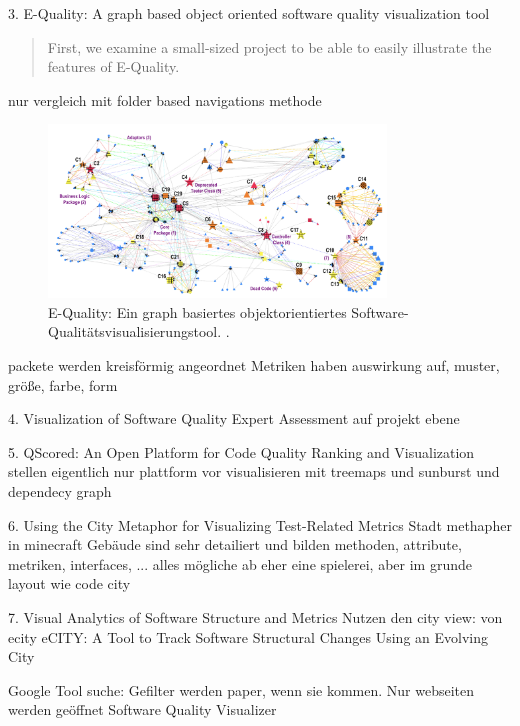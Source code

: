 3. E-Quality: A graph based object oriented software quality visualization tool \cite{eQuality}

\begin{quote}
    First, we examine a small-sized project to be able to easily illustrate the features of E-Quality. \cite[5]{eQuality}
\end{quote}
nur vergleich mit folder based navigations methode

\begin{figure}
    \centering
    \includegraphics[width=0.8\textwidth]{images/literatur/equality.png}
    \caption{E-Quality: Ein graph basiertes objektorientiertes Software-Qualitätsvisualisierungstool. \cite[5]{eQuality}.}
    \label{fig:eQuality}
\end{figure}

packete werden kreisförmig angeordnet
Metriken haben auswirkung auf, muster, größe, farbe, form


4. Visualization of Software Quality Expert Assessment \cite{visSoftQualExpert}
auf projekt ebene



5. QScored: An Open Platform for Code Quality Ranking and Visualization \cite{QScored}
stellen eigentlich nur plattform vor
visualisieren mit treemaps und sunburst und dependecy graph


6. Using the City Metaphor for Visualizing Test-Related Metrics \cite{citMetaphorTestMetrics}
Stadt methapher in minecraft
Gebäude sind sehr detailiert und bilden methoden, attribute, metriken, interfaces, ... alles mögliche ab
eher eine spielerei, aber im grunde layout wie code city

7. Visual Analytics of Software Structure and Metrics \cite{visAnaSoftStructure}
Nutzen den city view: von ecity \cite{ecity}
eCITY: A Tool to Track Software Structural Changes Using an Evolving City





Google Tool suche:
Gefilter werden paper, wenn sie kommen. Nur webseiten werden geöffnet
Software Quality Visualizer


